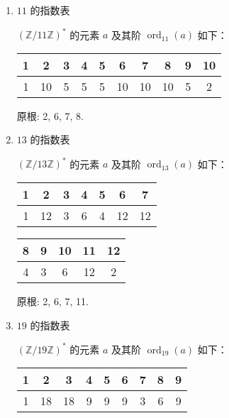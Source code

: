 \begin{enumerate}
\begin{solution}
\begin{enumerate}
        \item $11$ 的指数表
        
$(\mathbb{Z}/11\mathbb{Z})^*$ 的元素 $a$ 及其阶 $\operatorname{ord}_{11}(a)$ 如下：
            \begin{center}
            \begin{tabular}{|*{10}{c|}}
            \hline
            1 & 2 & 3 & 4 & 5 & 6 & 7 & 8 & 9 & 10 \\
            \hline
            1 & 10 & 5 & 5 & 5 & 10 & 10 & 10 & 5 & 2 \\
            \hline
            \end{tabular}
            \end{center}
            原根: 2, 6, 7, 8.

        \item $13$ 的指数表
        
$(\mathbb{Z}/13\mathbb{Z})^*$ 的元素 $a$ 及其阶 $\operatorname{ord}_{13}(a)$ 如下：
            \begin{center}
            \begin{tabular}{|*{7}{c|}}
            \hline
            1 & 2 & 3 & 4 & 5 & 6 & 7 \\
            \hline
            1 & 12 & 3 & 6 & 4 & 12 & 12 \\
            \hline
            \end{tabular}
            \vspace{0.5em} %
            
            \begin{tabular}{|*{5}{c|}}
            \hline
            8 & 9 & 10 & 11 & 12 \\
            \hline
            4 & 3 & 6 & 12 & 2 \\
            \hline
            \end{tabular}
            \end{center}
            原根: 2, 6, 7, 11.

        \item $19$ 的指数表

        $(\mathbb{Z}/19\mathbb{Z})^*$ 的元素 $a$ 及其阶 $\operatorname{ord}_{19}(a)$ 如下：
            \begin{center}
            \begin{tabular}{|*{9}{c|}}
            \hline
            1 & 2 & 3 & 4 & 5 & 6 & 7 & 8 & 9 \\
            \hline
            1 & 18 & 18 & 9 & 9 & 9 & 3 & 6 & 9 \\
            \hline
            \end{tabular}
            \vspace{0.5em} %
            

\end{center}
\end{enumerate}
\end{solution}
\end{enumerate}
